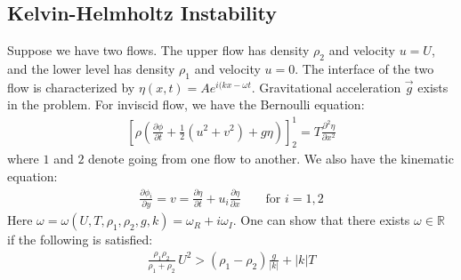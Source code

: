\documentclass[11pt]{book}
\theoremstyle{break}
\theoremstyle{break}
\newcommand{\R}{\mathbb{R}}
\newcommand{\pd}{\partial}
\begin{document}
\subsection{Kelvin-Helmholtz Instability}
Suppose we have two flows. The upper flow has density $\rho_2$ and velocity $u = U$, and the lower level has density $\rho_1$ and velocity $u = 0$. The interface of the two flow is characterized by $\eta(x,t) = Ae^{i(kx-\omega t}$. Gravitational acceleration $\vec{g}$ exists in the problem. For inviscid flow, we have the Bernoulli equation:
\begin{align*}
\left[\rho \left(\frac{\pd \phi}{\pd t} + \frac{1}{2}(u^2 +v^2) + g\eta\right)\right]_2^1 = T\frac{\pd^2 \eta}{\pd x^2}
\end{align*}
where $1$ and $2$ denote going from one flow to another. We also have the kinematic equation:
\begin{align*}
\frac{\pd \phi_i}{\pd y} = v = \frac{\pd \eta}{\pd t} + u_i \frac{\pd \eta}{\pd x }\qquad \text{for }i = 1,2
\end{align*}
Here $\omega = \omega(U,T,\rho_1,\rho_2,g,k) = \omega_R + i\omega_I$. One can show that there exists $\omega \in \R$ if the following is satisfied:
\begin{align*}
\frac{\rho_1 \rho_2 }{\rho_1 + \rho_2}\, U^2 > (\rho_1 - \rho_2) \frac{g}{|k|} + |k|T
\end{align*} 
\end{document}
